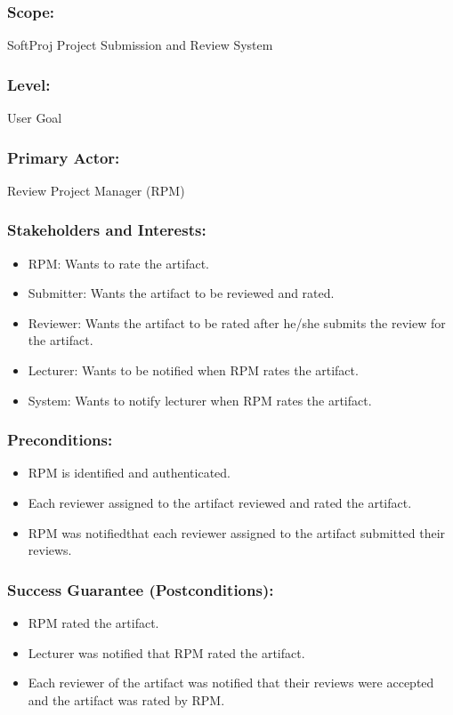     \subsubsection*{Scope:} SoftProj Project Submission and Review System
    \subsubsection*{\textbf{Level:} }User Goal
    \subsubsection*{\textbf{Primary Actor:} } Review Project Manager (RPM)
    \subsubsection*{\textbf{Stakeholders and Interests:}}
    \begin{itemize}
    \itemsep-1em 
    
    
    \item RPM: Wants to rate the artifact.
    \item  Submitter:  Wants the artifact to be reviewed and rated.
    \item  Reviewer:  Wants the artifact to be rated after he/she submits the review for the artifact.
    \item  Lecturer:  Wants to be notified when RPM rates the artifact.
    \item  System:  Wants to notify lecturer when RPM rates the artifact.
         
    \end{itemize}
    \newpage
    
    \subsubsection*{\textbf{Preconditions:}}
    \begin{itemize}
    \itemsep-1em 
        \item RPM is identified and authenticated.
        \item Each reviewer assigned to the artifact reviewed and rated the artifact.  
         \item RPM was notifiedthat each reviewer assigned to the artifact submitted their reviews. 
    \end{itemize}


    
    
    
    \subsubsection*{Success Guarantee (Postconditions):}
    \begin{itemize}
    \itemsep-1em 
       \item RPM rated the artifact. 
       \item Lecturer was notified that RPM rated the artifact. 
       \item Each reviewer of the artifact was notified that their reviews were accepted and the artifact was rated by RPM.
    \end{itemize}
    
